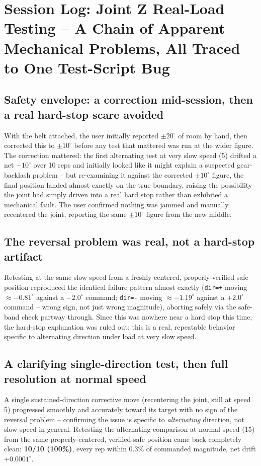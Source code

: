 \documentclass[11pt,letterpaper]{article}
\begin{document}
\section{Session Log: Joint Z Real-Load Testing -- A Chain of Apparent Mechanical Problems, All Traced to One Test-Script Bug}
\label{sec:session-joint-z-real-load}

\subsection{Safety envelope: a correction mid-session, then a real hard-stop scare avoided}
With the belt attached, the user initially reported $\pm 20^\circ$ of room by hand, then corrected this to $\pm 10^\circ$ before any test that mattered was run at the wider figure. The correction mattered: the first alternating test at very slow speed (5) drifted a net $-10^\circ$ over 10 reps and initially looked like it might explain a suspected gear-backlash problem -- but re-examining it against the corrected $\pm 10^\circ$ figure, the final position landed almost exactly on the true boundary, raising the possibility the joint had simply driven into a real hard stop rather than exhibited a mechanical fault. The user confirmed nothing was jammed and manually recentered the joint, reporting the same $\pm 10^\circ$ figure from the new middle.

\subsection{The reversal problem was real, not a hard-stop artifact}
Retesting at the same slow speed from a freshly-centered, properly-verified-safe position reproduced the identical failure pattern almost exactly (\texttt{dir=+} moving $\approx -0.81^\circ$ against a $-2.0^\circ$ command; \texttt{dir=-} moving $\approx -1.19^\circ$ against a $+2.0^\circ$ command -- wrong sign, not just wrong magnitude), aborting safely via the safe-band check partway through. Since this was nowhere near a hard stop this time, the hard-stop explanation was ruled out: this is a real, repeatable behavior specific to alternating direction under load at very slow speed.

\subsection{A clarifying single-direction test, then full resolution at normal speed}
A single sustained-direction corrective move (recentering the joint, still at speed 5) progressed smoothly and accurately toward its target with no sign of the reversal problem -- confirming the issue is specific to \emph{alternating} direction, not slow speed in general. Retesting the alternating comparison at normal speed (15) from the same properly-centered, verified-safe position came back completely clean: \textbf{10/10 (100\%)}, every rep within 0.3\% of commanded magnitude, net drift $+0.0001^\circ$.
\end{document}
